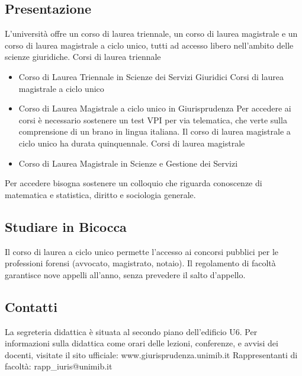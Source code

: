 
\subsection{Presentazione}
L'università offre un corso di laurea triennale, un corso di laurea magistrale e un corso di laurea magistrale a ciclo unico, tutti ad accesso libero nell'ambito delle scienze giuridiche.
Corsi di laurea triennale
\begin{itemize}
     \item Corso di Laurea Triennale in Scienze dei Servizi Giuridici 
Corsi di laurea magistrale a ciclo unico
     \item Corso di Laurea Magistrale a ciclo unico in Giurisprudenza 
Per accedere ai corsi è necessario sostenere un test VPI per via telematica, che verte sulla comprensione di un brano in lingua italiana. Il corso di laurea magistrale a ciclo unico ha durata quinquennale. 
Corsi di laurea magistrale
     \item Corso di Laurea Magistrale in Scienze e Gestione dei Servizi 
\end{itemize}
Per accedere bisogna sostenere un colloquio che riguarda conoscenze di matematica e statistica, diritto e sociologia generale. 

\subsection{Studiare in Bicocca}
Il corso di laurea a ciclo unico permette l'accesso ai concorsi pubblici per le professioni forensi (avvocato, magistrato, notaio). Il regolamento di facoltà garantisce nove appelli all'anno, senza prevedere il salto d'appello. 

\subsection{Contatti}
La segreteria didattica è situata al secondo piano dell'edificio U6. Per informazioni sulla didattica come orari delle lezioni, conferenze, e avvisi dei docenti, visitate il sito ufficiale: www.giurisprudenza.unimib.it 
Rappresentanti di facoltà: rapp\_iuris@unimib.it 
